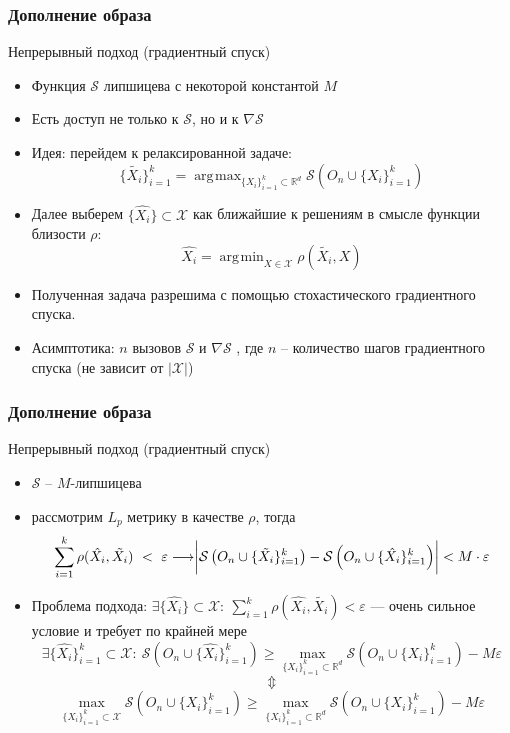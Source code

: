 \documentclass[10pt]{beamer}
\DeclareMathOperator*{\argmax}{\arg\!\max}
\DeclareMathOperator*{\argmin}{\arg\!\min}
\begin{document}
\begin{frame}
	\frametitle{Дополнение образа}
	\begin{block}{Непрерывный подход (градиентный спуск)}
		\begin{itemize}
			\item Функция $\mathcal{S}$ липшицева с некоторой константой $M$
			\item Есть доступ не только к $\mathcal{S}$, но и к $\nabla\mathcal{S}$ 
			\item Идея: перейдем к релаксированной задаче:
			 	$$\{\tilde{X_i}\}_{i=1}^k= \argmax_{\{X_i\}_{i=1}^k\subset\mathbb{R}^d} \mathcal{S}\left(O_n\cup\{X_i\}_{i=1}^k\right)$$
	 \item Далее выберем $\{\hat{X_i}\}\subset\mathcal{X}$ как ближайшие к решениям  в смысле функции близости $\rho$:
	 \vspace{-0.3cm}
	 $$\hat{X_i} =  \argmin_{X\in\mathcal{X}} \rho(\tilde{X_i}, X)$$
	  \vspace{-0.5cm}
	 \item Полученная задача разрешима с помощью стохастического градиентного спуска.
	 \item Асимптотика: $n$ вызовов $\mathcal{S}$ и $\nabla\mathcal{S}$ , где $n$ -- количество шагов градиентного спуска (не зависит от $|\mathcal{X}|$)
		\end{itemize}
	\end{block}
\end{frame}


\begin{frame}
	\frametitle{Дополнение образа}
	\begin{block}{Непрерывный подход (градиентный спуск)}
		\begin{itemize}
			\item $\mathcal{S}$ -- $M$-липшицева
			\item рассмотрим $L_p$ метрику в качестве $\rho$, тогда
			$$\sum_{i=1}^k\rho(\hat{X_i}, \tilde{X_i})~<~\varepsilon\longrightarrow \biggr{|}\mathcal{S}\left(O_n\cup\{\tilde{X_i}\}_{i=1}^k\right) - \mathcal{S}\left(O_n\cup\{\hat{X_i}\}_{i=1}^k\right)\biggr{|} < M\cdot\varepsilon$$
			
			\item Проблема подхода: $\exists\{\hat{X_i}\}\subset \mathcal{X}:~ \sum\limits_{i=1}^k\rho(\hat{X_i}, \tilde{X_i}) < \varepsilon$ --- очень сильное условие и требует по крайней мере
			$$\exists \{\hat{X_i}\}_{i=1}^k\subset\mathcal{X}:~ \mathcal{S}\left(O_n\cup\{\hat{X_i}\}_{i=1}^k\right) \geqslant \max_{\{X_i\}_{i=1}^k\subset\mathbb{R}^d} \mathcal{S}\left(O_n\cup\{X_i\}_{i=1}^k\right) - M\varepsilon$$
			$$\Updownarrow$$
			$$\max_{\{X_i\}_{i=1}^k\subset\mathcal{X}} \mathcal{S}\left(O_n\cup\{X_i\}_{i=1}^k\right) \geqslant \max_{\{X_i\}_{i=1}^k\subset\mathbb{R}^d} \mathcal{S}\left(O_n\cup\{X_i\}_{i=1}^k\right) - M\varepsilon$$
		\end{itemize}
	\end{block}
\end{frame}
\end{document}
